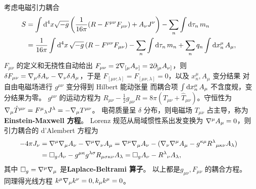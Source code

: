 考虑电磁引力耦合
\begin{align}
    S &= \int\dd[4]x\sqrt{-g} \left(\frac{1}{16\pi} (R - F^{\mu\nu} F_{\mu\nu})+A_\nu J^\nu\right) - \sum_n\int\dd{\tau_n} m_n\notag\\
    &= \frac{1}{16\pi}\int\dd[4]{x}\sqrt{-g}\,(R - F^{\mu\nu} F_{\mu\nu}) -\sum_n\int\dd{\tau_n} m_n+ \sum_n q_n \int\dd{x^\mu_n} A_\mu,
\end{align}
$F_{\mu\nu}$ 的定义和无挠性自动给出 $F_{\mu\nu}=2\nabla_{[\mu}A_{\nu]}=2\partial_{[\mu}A_{\nu]}$，则 $\var F_{\mu\nu} =\nabla_\mu\var A_\nu-\nabla_\nu\var A_\mu$，于是 $F_{[\mu\nu;\lambda]}=F_{[\mu\nu,\lambda]}=0$，以及 $x^\mu_n,A_\mu$ 变分结果
对自由电磁场进行 $g^{\mu\nu}$ 变分得到 Hilbert 能动张量
而耦合项 $\int\dd{x^\mu_n} A_\mu$ 不含度规，变分结果为零。
$g^{\mu\nu}$ 的运动方程为 $R_{\mu\nu}-\frac12 g_{\mu\nu} R=8\pi(T_{\mu\nu} + \hat T_{\mu\nu})$。守恒性为 $\nabla_\mu\hat T^{\mu\nu}=F^\mu{}_{\lambda}J^\lambda=-\nabla_\mu T^{\mu\nu}$。
电荷质量呈 $\delta$ 分布，则电磁场 $T_{\mu\nu}$ 占主导，称为\textbf{Einstein-Maxwell 方程}。
Lorenz 规范从局域惯性系出发变换为 $\nabla^\mu A_\mu =0$，则引力耦合的 d'Alembert 方程为
\begin{align}
    -4\pi J_\nu&=\nabla^\mu\nabla_\mu A_\nu- \nabla^\mu \nabla_\nu A_\mu = \nabla^\mu\nabla_\mu A_\nu- (\nabla_\nu\nabla^\mu A_\mu -g^{\kappa\mu} R^\lambda{}_{\mu\kappa\nu} A_\lambda)\notag\\
    &=\square_g A_\nu-g^{\mu\kappa} g^{\lambda\sigma} R_{\mu\sigma\kappa\nu} A_\lambda=\square_g A_\nu- R^\lambda{}_{\nu} A_\lambda,
\end{align}
其中 $\square_g=\nabla^\mu\nabla_\mu$ 是\textbf{Laplace-Beltrami 算子}。
以上都是$g_{\mu\nu},F_{\mu\nu}$ 的耦合方程。
同理得光线方程 $k^\mu\nabla_\mu k^\nu=0, k_\mu k^\mu = 0$。

